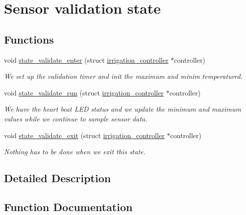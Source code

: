\hypertarget{group__state__validate}{}\section{Sensor validation state}
\label{group__state__validate}
\subsection*{Functions}
\begin{DoxyCompactItemize}
\item 
void \hyperlink{group__state__validate_gac0d41d4685bd461b3a613f6320405b79}{state\+\_\+validate\+\_\+enter} (struct \hyperlink{structirrigation__controller}{irrigation\+\_\+controller} $\ast$controller)
\begin{DoxyCompactList}\small\item\em We set up the validation timer and init the maximum and minim temperatured. \end{DoxyCompactList}\item 
void \hyperlink{group__state__validate_gaec38509b93f8a850919aa7a36e543ed5}{state\+\_\+validate\+\_\+run} (struct \hyperlink{structirrigation__controller}{irrigation\+\_\+controller} $\ast$controller)
\begin{DoxyCompactList}\small\item\em We have the heart beat L\+E\+D status and we update the minimum and maximum values while we continue to sample sensor data. \end{DoxyCompactList}\item 
void \hyperlink{group__state__validate_gac480e756742ffd9acd9bd21ac1e8885c}{state\+\_\+validate\+\_\+exit} (struct \hyperlink{structirrigation__controller}{irrigation\+\_\+controller} $\ast$controller)
\begin{DoxyCompactList}\small\item\em Nothing has to be done when we exit this state. \end{DoxyCompactList}\end{DoxyCompactItemize}


\subsection{Detailed Description}


\subsection{Function Documentation}
\hypertarget{group__state__validate_gac0d41d4685bd461b3a613f6320405b79}{}
